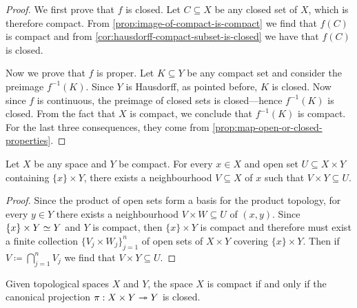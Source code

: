 \begin{proof}
We first prove that \(f\) is closed. Let \(C \subseteq X\) be any closed set of
\(X\), which is therefore compact. From \cref{prop:image-of-compact-is-compact}
we find that \(f(C)\) is compact and from
\cref{cor:hausdorff-compact-subset-is-closed} we have that \(f(C)\) is closed.

Now we prove that \(f\) is proper. Let \(K \subseteq Y\) be any compact set and
consider the preimage \(f^{-1}(K)\). Since \(Y\) is Hausdorff, as pointed
before, \(K\) is closed. Now since \(f\) is continuous, the preimage of closed
sets is closed---hence \(f^{-1}(K)\) is closed. From the fact that \(X\) is
compact, we conclude that \(f^{-1}(K)\) is compact. For the last three
consequences, they come from \cref{prop:map-open-or-closed-properties}.
\end{proof}

\begin{lemma}
\label{lem:tube-lemma}
Let \(X\) be any space and \(Y\) be compact. For every \(x \in X\) and open set
\(U \subseteq X \times Y\) containing \(\{x\} \times Y\), there exists a
neighbourhood \(V \subseteq X\) of \(x\) such that \(V \times Y \subseteq U\).
\end{lemma}

\begin{proof}
Since the product of open sets form a basis for the product topology, for every
\(y \in Y\) there exists a neighbourhood \(V \times W \subseteq U\) of
\((x, y)\). Since \(\{x\} \times Y \simeq Y\) and \(Y\) is compact, then
\(\{x\} \times Y\) is compact and therefore must exist a finite collection
\(\{V_j \times W_j\}_{j=1}^n\) of open sets of \(X \times Y\) covering
\(\{x\} \times Y\). Then if \(V \coloneq \bigcap_{j=1}^n V_j\) we find that
\(V \times Y \subseteq U\).
\end{proof}

\begin{theorem}
\label{prop:compact-iff-projection-closed}
Given topological spaces \(X\) and \(Y\), the space \(X\) is compact if and only
if the canonical projection \(\pi: X \times Y \twoheadrightarrow Y\) is closed.
\end{theorem}

